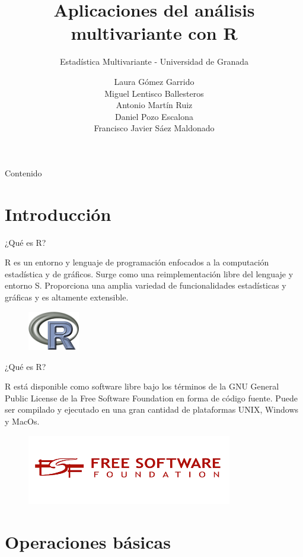 \documentclass[xcolor=table]{beamer}
\title{Aplicaciones del análisis multivariante con R}
\subtitle{Estadística Multivariante - Universidad de Granada}
\author{Laura Gómez Garrido\\ Miguel Lentisco Ballesteros \\ Antonio Martín Ruiz \\ Daniel Pozo Escalona \\Francisco Javier Sáez Maldonado}
\begin{document}
\begin{frame}
\titlepage
\end{frame}
\begin{frame}{Contenido}
  \tableofcontents
\end{frame}
\section{Introducción}

\begin{frame}{¿Qué es R?}

R es un entorno y lenguaje de programación enfocados a la computación
estadística y de gráficos. Surge como una reimplementación libre del lenguaje y
entorno S. Proporciona una amplia variedad de funcionalidades estadísticas y
gráficas y es altamente extensible.
\begin{figure}
\includegraphics[width=0.2\textwidth]{r.png}
\end{figure}
\end{frame}

\begin{frame}{¿Qué es R?}
  
R está disponible como software libre bajo los términos de la GNU General Public
License de la Free Software Foundation en forma de código fuente. Puede ser
compilado y ejecutado en una gran cantidad de plataformas UNIX, Windows y MacOs.

\begin{figure}
\includegraphics[width=0.8\textwidth]{fsf.png}
\end{figure}

\end{frame}

\section{Operaciones básicas}
\end{document}

